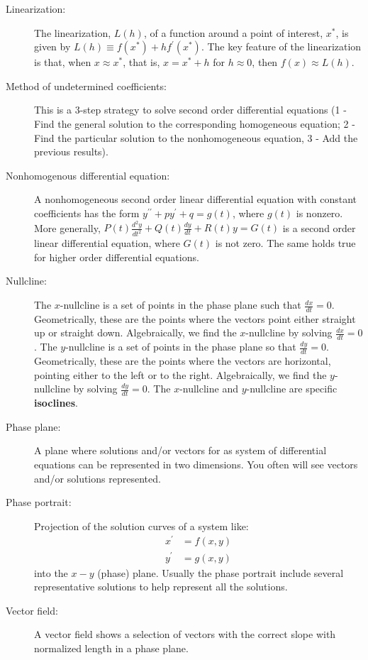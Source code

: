 \begin{description}
\item[Linearization:] The linearization, $L(h)$, of a function around a point of interest, $x^*$, is given by $L(h) \equiv f(x^*) + hf^\prime(x^*)$. The key feature of the linearization is that, when $x \approx x^*$, that is, $x = x^* + h$ for $h \approx 0$, then $f(x) \approx L(h)$.
\item[Method of undetermined coefficients:] This is a 3-step strategy to solve second order differential equations (1 - Find the general solution to the corresponding homogeneous equation; 2 - Find the particular solution to the nonhomogeneous equation, 3 - Add the previous results).
\item[Nonhomogenous differential equation:] A nonhomogeneous second order linear differential equation with constant coefficients has the form $y^{\prime\prime}+py^\prime+q=g(t)$, where $g(t)$ is nonzero. More generally, $P(t)\frac{d^2y}{dt^2}+Q(t)\frac{dy}{dt}+R(t)y=G(t)$ is a second order linear differential equation, where $G(t)$ is not zero. The same holds true for higher order differential equations.
\item[Nullcline:] The $x$-nullcline is a set of points in the phase plane such that $\frac{dx}{dt} = 0$. Geometrically, these are the points where the vectors point either straight up or straight down. Algebraically, we find the $x$-nullcline by solving $\frac{dx}{dt} = 0$. The $y$-nullcline is a set of points in the phase plane so that $\frac{dy}{dt} = 0$. Geometrically, these are the points where the vectors are horizontal, pointing either to the left or to the right. Algebraically, we find the $y$-nullcline by solving $\frac{dy}{dt} = 0$. The $x$-nullcline and $y$-nullcline are specific \textbf{isoclines}.
\item[Phase plane:] A plane where solutions and/or vectors for as system of differential equations can be represented in two dimensions. You often will see vectors and/or solutions represented.  
\item[Phase portrait:] Projection of the solution curves of a system like:
\begin{align*}
x^\prime &= f(x,y) \\
y^\prime &= g(x,y)
\end{align*}
into the $x-y$ (phase) plane. Usually the phase portrait include several representative solutions to help represent all the solutions.
\item[Vector field:] A vector field shows a selection of vectors with the correct slope with normalized length in a phase plane.

\end{description}